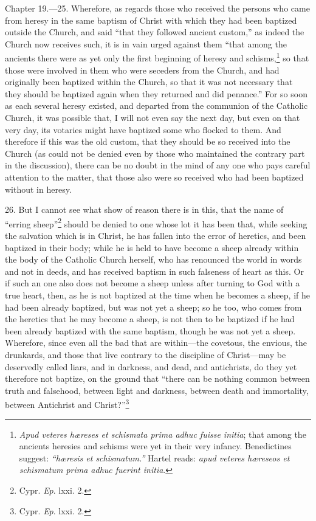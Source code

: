 Chapter 19.—25. Wherefore, as regards those who received the persons who came from heresy in the same baptism of Christ with which they had been baptized outside the Church, and said ``that they followed ancient custom,'' as indeed the Church now receives such, it is in vain urged against them ``that among the ancients there were as yet only the first beginning of heresy and schisms,\footnote{\par  \emph{Apud veteres hæreses et schismata prima adhuc fuisse initia}; that among the ancients heresies and schisms were yet in their very infancy. Benedictines suggest: \emph{``hæresis et schismatum.''} Hartel reads: \emph{apud veteres hæreseos et schismatum prima adhuc fuerint initia}.} so that those were involved in them who were seceders from the Church, and had originally been baptized within the Church, so that it was not necessary that they should be baptized again when they returned and did penance.'' For so soon as each several heresy existed, and departed from the communion of the Catholic Church, it was possible that, I will not even say the next day, but even on that very day, its votaries might have baptized some who flocked to them. And therefore if this was the old custom, that they should be so received into the Church (as could not be denied even by those who maintained the contrary part in the discussion), there can be no doubt in the mind of any one who pays careful attention to the matter, that those also were so received who had been baptized without in heresy.

26. But I cannot see what show of reason there is in this, that the name of ``erring sheep''\footnote{\par  Cypr. \emph{Ep}. lxxi. 2.} should be denied to one whose lot it has been that, while seeking the salvation which is in Christ, he has fallen into the error of heretics, and been baptized in their body; while he is held to have become a sheep already within the body of the Catholic Church herself, who has renounced the world in words and not in deeds, and has received baptism in such falseness of heart as this. Or if such an one also does not become a sheep unless after turning to God with a true heart, then, as he is not baptized at the time when he becomes a sheep, if he had been already baptized, but was not yet a sheep; so he too, who comes from the heretics that he may become a sheep, is not then to be baptized if he had been already baptized with the same baptism, though he was not yet a sheep. Wherefore, since even all the bad that are within—the covetous, the envious, the drunkards, and those that live contrary to the discipline of Christ—may be deservedly called liars, and in darkness, and dead, and antichrists, do they yet therefore not baptize, on the ground that ``there can be nothing common between truth and falsehood, between light and darkness, between death and immortality, between Antichrist and Christ?''\footnote{\par  Cypr. \emph{Ep}. lxxi. 2.}

